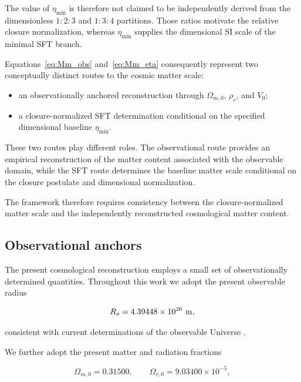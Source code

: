 \documentclass[12pt]{article}
\begin{document}
The value of $\eta_{\min}$ is therefore not claimed to be independently
derived from the dimensionless $1{:}2{:}3$ and $1{:}3{:}4$ partitions.
Those ratios motivate the relative closure normalization, whereas
$\eta_{\min}$ supplies the dimensional SI scale of the minimal SFT
branch.

Equations~\eqref{eq:Mm_obs} and~\eqref{eq:Mm_eta} consequently represent
two conceptually distinct routes to the cosmic matter scale:
\begin{itemize}

\item an observationally anchored reconstruction through
$\Omega_{m,0}$, $\rho_c$, and $V_0$;

\item a closure-normalized SFT determination conditional on the
specified dimensional baseline $\eta_{\min}$.

\end{itemize}

These two routes play different roles. The observational route provides
an empirical reconstruction of the matter content associated with the
observable domain, while the SFT route determines the baseline matter
scale conditional on the closure postulate and dimensional
normalization.

The framework therefore requires consistency between the
closure-normalized matter scale and the independently reconstructed
cosmological matter content.

\subsection{Observational anchors}

The present cosmological reconstruction employs a small set of
observationally determined quantities. Throughout this work we adopt the
present observable radius

\begin{equation}
R_o
=
4.39448\times10^{26}\ {\rm m},
\end{equation}

consistent with current determinations of the observable Universe
\cite{Planck2020,Weinberg2008}.

We further adopt the present matter and radiation fractions

\begin{equation}
\Omega_{m,0}
=
0.31500,
\qquad
\Omega_{r,0}
=
9.03400\times10^{-5},
\end{equation}
\end{document}
